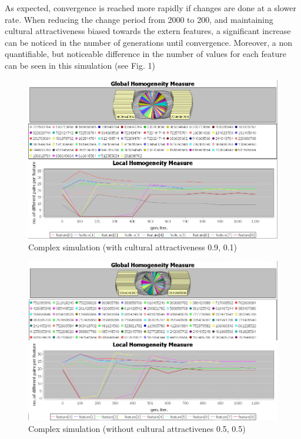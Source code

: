\documentclass[twoside, 11pt, a4paper]{article}
\begin{document}
As expected, convergence is reached more rapidly if changes are done at a slower rate. 
When reducing the change period from 2000 to 200, and maintaining cultural attractiveness biased towards the extern features, a significant increase can be noticed in the number of generations until convergence. Moreover, a non quantifiable, but noticeable difference in the number of values for each feature can be seen in this simulation (see Fig. 1)

\begin{figure}[htp]
		\centering
		\includegraphics[width=\textwidth]{fig1}
		\caption{Complex simulation (with cultural attractiveness 0.9, 0.1)}
		\label{Fig 1}
\end{figure}

\begin{figure}[htp]
		\centering
		\includegraphics[width=\textwidth]{fig2}
		\caption{Complex simulation (without cultural attractivenes 0.5, 0.5)}
		\label{Fig 2}
\end{figure}
\end{document}
